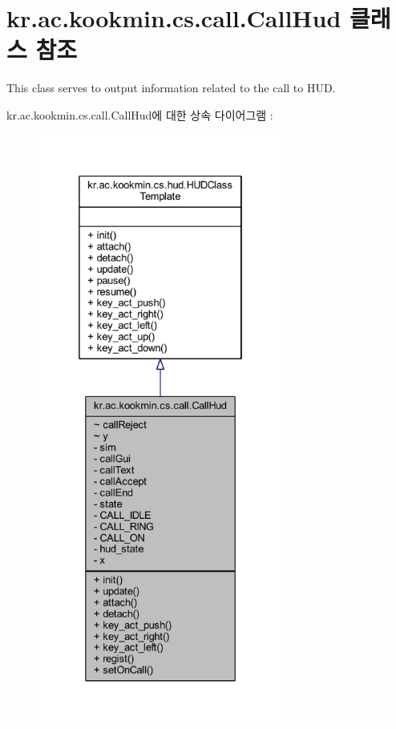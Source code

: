 \hypertarget{classkr_1_1ac_1_1kookmin_1_1cs_1_1call_1_1_call_hud}{}\section{kr.\+ac.\+kookmin.\+cs.\+call.\+Call\+Hud 클래스 참조}
\label{classkr_1_1ac_1_1kookmin_1_1cs_1_1call_1_1_call_hud}


This class serves to output information related to the call to H\+U\+D.  




kr.\+ac.\+kookmin.\+cs.\+call.\+Call\+Hud에 대한 상속 다이어그램 \+: \nopagebreak
\begin{figure}[H]
\begin{center}
\leavevmode
\includegraphics[height=550pt]{classkr_1_1ac_1_1kookmin_1_1cs_1_1call_1_1_call_hud__inherit__graph}
\end{center}
\end{figure}


